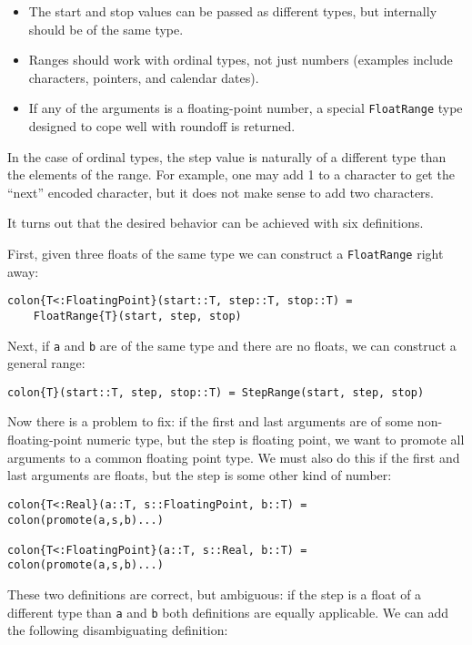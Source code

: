 \begin{itemize}
\item The start and stop values can be passed as different types, but internally
  should be of the same type.
\item Ranges should work with ordinal types, not just numbers (examples include
  characters, pointers, and calendar dates).
\item If any of the arguments is a floating-point number, a special
  \texttt{FloatRange} type designed to cope well with roundoff is returned.
\end{itemize}

In the case of ordinal types, the step value is naturally of a different type
than the elements of the range.
For example, one may add 1 to a character to get the ``next'' encoded character,
but it does not make sense to add two characters.

It turns out that the desired behavior can be achieved with six definitions.

First, given three floats of the same type we can construct a \texttt{FloatRange}
right away:

\begin{verbatim}
colon{T<:FloatingPoint}(start::T, step::T, stop::T) =
    FloatRange{T}(start, step, stop)
\end{verbatim}

Next, if \texttt{a} and \texttt{b} are of the same type and there are no floats,
we can construct a general range:

\begin{verbatim}
colon{T}(start::T, step, stop::T) = StepRange(start, step, stop)
\end{verbatim}

Now there is a problem to fix: if the first and last arguments are of some
non-floating-point numeric type, but the step is floating point, we want to
promote all arguments to a common floating point type. We must also do this
if the first and last arguments are floats, but the step is some other kind
of number:

\begin{verbatim}
colon{T<:Real}(a::T, s::FloatingPoint, b::T) = colon(promote(a,s,b)...)

colon{T<:FloatingPoint}(a::T, s::Real, b::T) = colon(promote(a,s,b)...)
\end{verbatim}

These two definitions are correct, but ambiguous: if the step is a float
of a different type than \texttt{a} and \texttt{b} both definitions are
equally applicable. We can add the following disambiguating definition:

